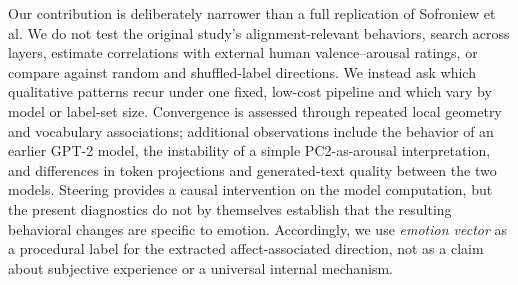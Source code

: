 Our contribution is deliberately narrower than a full replication of
Sofroniew et al.  We do not test the original study's alignment-relevant
behaviors, search across layers, estimate correlations with external human
valence--arousal ratings, or compare against random and shuffled-label
directions.  We instead ask which qualitative patterns recur under one fixed,
low-cost pipeline and which vary by model or label-set size.  Convergence is
assessed through repeated local geometry and vocabulary associations; additional
observations include the behavior of an earlier GPT-2 model, the instability
of a simple PC2-as-arousal interpretation, and differences in token projections
and generated-text quality between the two models.  Steering provides a causal
intervention on the model computation, but the present diagnostics do not by
themselves establish that the resulting behavioral changes are specific to
emotion.  Accordingly, we use \emph{emotion vector} as a procedural label for
the extracted affect-associated direction, not as a claim about subjective
experience or a universal internal mechanism.
